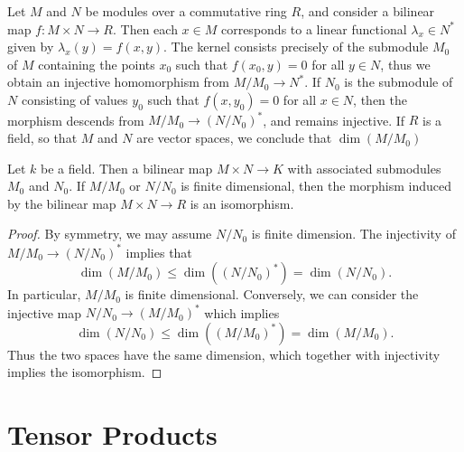 Let $M$ and $N$ be modules over a commutative ring $R$, and consider a bilinear map $f: M \times N \to R$. Then each $x \in M$ corresponds to a linear functional $\lambda_x \in N^*$ given by $\lambda_x(y) = f(x,y)$. The kernel consists precisely of the submodule $M_0$ of $M$ containing the points $x_0$ such that $f(x_0,y) = 0$ for all $y \in N$, thus we obtain an injective homomorphism from $M/M_0 \to N^*$. If $N_0$ is the submodule of $N$ consisting of values $y_0$ such that $f(x,y_0) = 0$ for all $x \in N$, then the morphism descends from $M/M_0 \to (N/N_0)^*$, and remains injective. If $R$ is a field, so that $M$ and $N$ are vector spaces, we conclude that $\dim(M/M_0)$

\begin{lemma}
    Let $k$ be a field. Then a bilinear map $M \times N \to K$ with associated submodules $M_0$ and $N_0$. If $M/M_0$ or $N/N_0$ is finite dimensional, then the morphism induced by the bilinear map $M \times N \to R$ is an isomorphism.
\end{lemma}
\begin{proof}
    By symmetry, we may assume $N/N_0$ is finite dimension. The injectivity of $M/M_0 \to (N/N_0)^*$ implies that
    \[ \dim(M/M_0) \leq \dim((N/N_0)^*) = \dim(N/N_0). \]
    In particular, $M/M_0$ is finite dimensional. Conversely, we can consider the injective map $N/N_0 \to (M/M_0)^*$ which implies
    \[ \dim(N/N_0) \leq \dim((M/M_0)^*) = \dim(M/M_0). \]
    Thus the two spaces have the same dimension, which together with injectivity implies the isomorphism.
\end{proof}

\section{Tensor Products}


